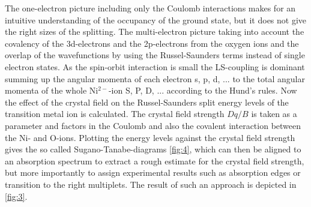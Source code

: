 \FloatBarrier
The one-electron picture including only the Coulomb interactions makes for an intuitive understanding of the occupancy of the ground state, but it does not give the right sizes of the splitting.
The multi-electron picture taking into account the covalency of the 3d-electrons and the 2p-electrons from the oxygen ions and the overlap of the wavefunctions by using the Russel-Saunders terms instead of single electron states.
As the spin-orbit interaction is small the LS-coupling is dominant summing up the angular momenta of each electron s, p, d, ... to the total angular momenta of the whole Ni$^{2-}$-ion S, P, D, ... according to the Hund's rules.
Now the effect of the crystal field on the Russel-Saunders split energy levels of the transition metal ion is calculated.
The crystal field strength $Dq/B$ is taken as a parameter and factors in the Coulomb and also the covalent interaction between the Ni- and O-ions.
Plotting the energy levels against the crystal field strength gives the so called Sugano-Tanabe-diagrams \autoref{fig:4}, which can then be aligned to an absorption spectrum to extract a rough estimate for the crystal field strength, but more importantly to assign experimental results such as absorption edges or transition to the right multiplets.
The result of such an approach is depicted in \autoref{fig:3}.

